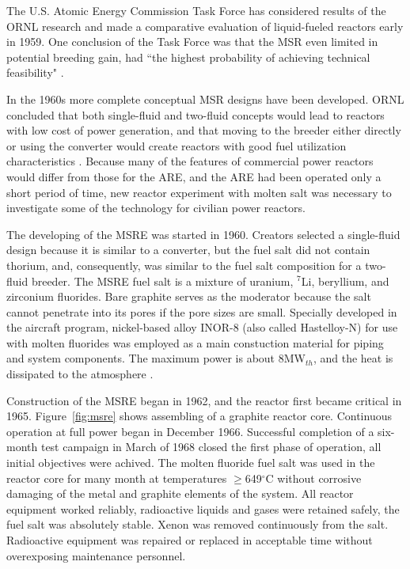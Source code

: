 The U.S. Atomic Energy Commission Task Force has considered results of the \gls{ORNL} research and made a comparative evaluation of liquid-fueled reactors early in 1959. One conclusion of the Task Force was that the \gls{MSR} even limited in potential breeding gain, had ``the highest probability of achieving technical feasibility" \cite{noauthor_report_1959}.

In the 1960s more complete conceptual \gls{MSR} designs have been developed. \gls{ORNL} concluded that both single-fluid and two-fluid concepts would lead to reactors with low cost of power generation, and that moving to the breeder either directly or using the converter would create reactors with good fuel utilization characteristics \cite{rosenthal_molten-salt_1970}. Because many of the features of commercial power reactors would differ from those for the \gls{ARE}, and the \gls{ARE} had been operated only a short period of time, new reactor experiment with molten salt was necessary to investigate some of the technology for civilian power reactors.

The developing of the \gls{MSRE} was started in 1960. Creators selected a single-fluid design because it is similar to a converter, but the fuel salt did not contain thorium, and, consequently, was similar to the fuel salt composition for a two-fluid breeder. The \gls{MSRE} fuel salt is a mixture of uranium, $^7$Li, beryllium, and zirconium fluorides. Bare graphite serves as the moderator because the salt cannot penetrate into its pores if the pore sizes are small. Specially developed in the aircraft program, nickel-based alloy INOR-8 (also called Hastelloy-N) for use with molten fluorides was employed as a main constuction material for piping and system components. The maximum power is about 8MW$_{th}$, and the heat is dissipated to the atmosphere \cite{haubenreich_experience_1970}.

Construction of the \gls{MSRE} began in 1962, and the reactor first became critical in 1965. Figure~\ref{fig:msre} shows assembling of a graphite reactor core. Continuous operation at full power began in December 1966. Successful completion of a six-month test campaign in March of 1968 closed the first phase of operation, all initial objectives were achived. The molten fluoride fuel salt was used in the reactor core for many month at temperatures $\geq$649$^{\circ}$C without corrosive damaging of the metal and graphite elements of the system. All reactor equipment worked reliably, radioactive liquids and gases were retained safely, the fuel salt was absolutely stable. Xenon was removed continuously from the salt. Radioactive equipment was repaired or replaced in acceptable time without overexposing maintenance personnel.

